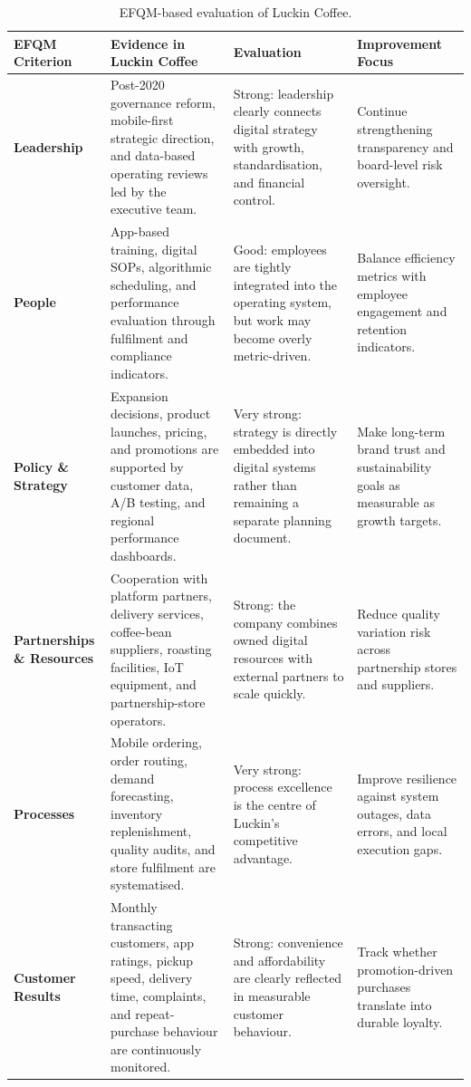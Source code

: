 \documentclass[12pt,a4paper]{article}
\renewcommand{\arraystretch}{1.28}
\begin{document}
\begin{landscape}
\thispagestyle{empty}
\begin{table}[H]
\centering
\scriptsize
\renewcommand{\arraystretch}{1.13}
\caption{EFQM-based evaluation of Luckin Coffee.}
\begin{tabularx}{\linewidth}{P{3.0cm}P{6.6cm}P{6.6cm}Y}
\toprule
\textbf{EFQM Criterion} & \textbf{Evidence in Luckin Coffee} & \textbf{Evaluation} & \textbf{Improvement Focus} \\
\midrule
\textbf{Leadership} & Post-2020 governance reform, mobile-first strategic direction, and data-based operating reviews led by the executive team. & Strong: leadership clearly connects digital strategy with growth, standardisation, and financial control. & Continue strengthening transparency and board-level risk oversight. \\
\midrule
\textbf{People} & App-based training, digital SOPs, algorithmic scheduling, and performance evaluation through fulfilment and compliance indicators. & Good: employees are tightly integrated into the operating system, but work may become overly metric-driven. & Balance efficiency metrics with employee engagement and retention indicators. \\
\midrule
\textbf{Policy \& Strategy} & Expansion decisions, product launches, pricing, and promotions are supported by customer data, A/B testing, and regional performance dashboards. & Very strong: strategy is directly embedded into digital systems rather than remaining a separate planning document. & Make long-term brand trust and sustainability goals as measurable as growth targets. \\
\midrule
\textbf{Partnerships \& Resources} & Cooperation with platform partners, delivery services, coffee-bean suppliers, roasting facilities, IoT equipment, and partnership-store operators. & Strong: the company combines owned digital resources with external partners to scale quickly. & Reduce quality variation risk across partnership stores and suppliers. \\
\midrule
\textbf{Processes} & Mobile ordering, order routing, demand forecasting, inventory replenishment, quality audits, and store fulfilment are systematised. & Very strong: process excellence is the centre of Luckin's competitive advantage. & Improve resilience against system outages, data errors, and local execution gaps. \\
\midrule
\textbf{Customer Results} & Monthly transacting customers, app ratings, pickup speed, delivery time, complaints, and repeat-purchase behaviour are continuously monitored. & Strong: convenience and affordability are clearly reflected in measurable customer behaviour. & Track whether promotion-driven purchases translate into durable loyalty. \\

\end{tabularx}
\end{table}
\end{landscape}
\end{document}
